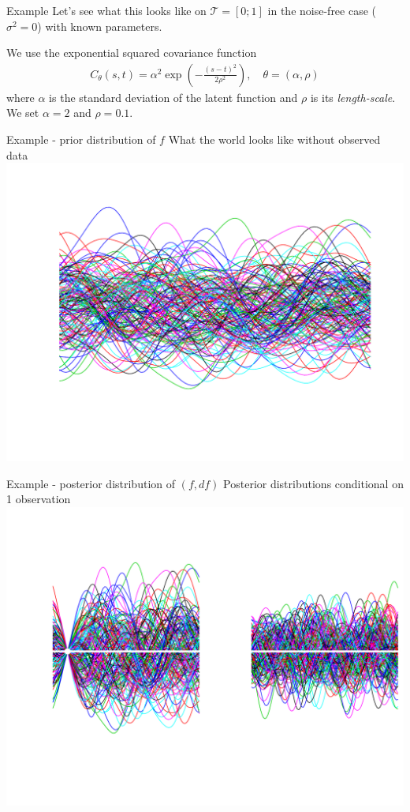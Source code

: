 \documentclass[ignorenonframetext,xcolor=pdflatex,table,dvipsnames,serif]{beamer}
\begin{document}
\begin{frame}{Example}
Let's see what this looks like on $\mathcal{T} = [0;1]$ in the noise-free case ($\sigma^2 = 0$) with known parameters.
  
We use the exponential squared covariance function
\begin{align*}
  C_\theta(s,t) = \alpha^2 \exp\left(-\frac{(s-t)^2}{2\rho^2}\right), \quad \theta = (\alpha, \rho)
\end{align*}
where $\alpha$ is the standard deviation of the latent function and $\rho$ is its \textit{length-scale}. We set $\alpha = 2$ and $\rho = 0.1$.
\end{frame}

\begin{frame}{Example - prior distribution of $f$}
  What the world looks like without observed data
  \center\includegraphics[scale=0.5]{postAni01}
\end{frame}

\begin{frame}{Example - posterior distribution of $(f, df)$}
  Posterior distributions conditional on 1 observation
  \center\includegraphics[scale=0.5]{postAni02}
\end{frame}
\end{document}
